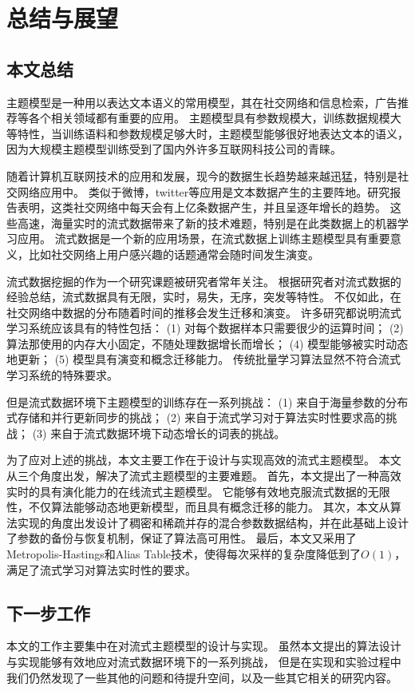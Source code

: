\chapter{总结与展望}
\label{chapter:summary}
\section{本文总结}

主题模型是一种用以表达文本语义的常用模型，其在社交网络和信息检索，广告推荐等各个相关领域都有重要的应用。
主题模型具有参数规模大，训练数据规模大等特性，当训练语料和参数规模足够大时，主题模型能够很好地表达文本的语义，
因为大规模主题模型训练受到了国内外许多互联网科技公司的青睐。

随着计算机互联网技术的应用和发展，现今的数据生长趋势越来越迅猛，特别是社交网络应用中。
类似于微博，twitter等应用是文本数据产生的主要阵地。研究报告表明，这类社交网络中每天会有上亿条数据产生，并且呈逐年增长的趋势。
这些高速，海量实时的流式数据带来了新的技术难题，特别是在此类数据上的机器学习应用。
流式数据是一个新的应用场景，在流式数据上训练主题模型具有重要意义，比如社交网络上用户感兴趣的话题通常会随时间发生演变。

流式数据挖掘的作为一个研究课题被研究者常年关注。
根据研究者对流式数据的经验总结，流式数据具有无限，实时，易失，无序，突发等特性。
不仅如此，在社交网络中数据的分布随着时间的推移会发生迁移和演变。
许多研究都说明流式学习系统应该具有的特性包括：
(1) 对每个数据样本只需要很少的运算时间；
(2) 算法那使用的内存大小固定，不随处理数据增长而增长；
(4) 模型能够被实时动态地更新；
(5) 模型具有演变和概念迁移能力。
传统批量学习算法显然不符合流式学习系统的特殊要求。

但是流式数据环境下主题模型的训练存在一系列挑战：
(1) 来自于海量参数的分布式存储和并行更新同步的挑战；
(2) 来自于流式学习对于算法实时性要求高的挑战；
(3) 来自于流式数据环境下动态增长的词表的挑战。

为了应对上述的挑战，本文主要工作在于设计与实现高效的流式主题模型。
本文从三个角度出发，解决了流式主题模型的主要难题。
首先，本文提出了一种高效实时的具有演化能力的在线流式主题模型。
它能够有效地克服流式数据的无限性，不仅算法能够动态地更新模型，而且具有概念迁移的能力。
其次，本文从算法实现的角度出发设计了稠密和稀疏并存的混合参数数据结构，并在此基础上设计了参数的备份与恢复机制，保证了算法高可用性。
最后，本文又采用了Metropolis-Hastings和Alias Table技术，使得每次采样的复杂度降低到了$O(1)$，满足了流式学习对算法实时性的要求。


\section{下一步工作}
本文的工作主要集中在对流式主题模型的设计与实现。
虽然本文提出的算法设计与实现能够有效地应对流式数据环境下的一系列挑战，
但是在实现和实验过程中我们仍然发现了一些其他的问题和待提升空间，以及一些其它相关的研究内容。

